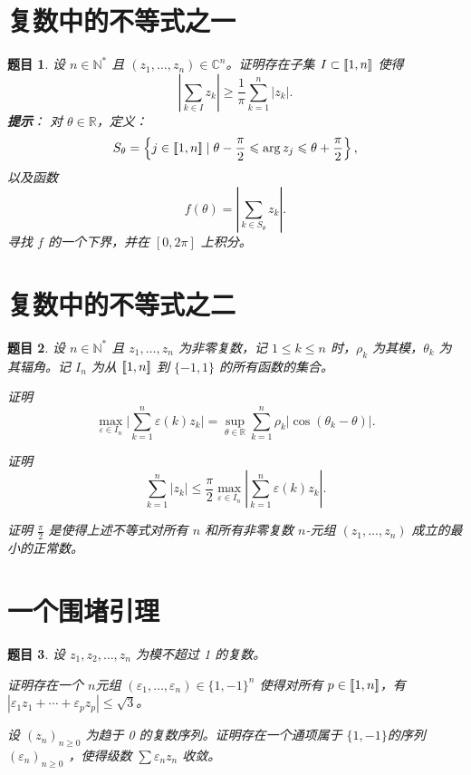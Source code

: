 \documentclass[12pt,UTF8,fontset=none]{ctexbook}
\theoremstyle{exercisestyle}
\newtheorem*{exercise}{题目}
\theoremstyle{solutionstyle}
\begin{document}
\section{复数中的不等式之一}
\begin{exercise}
设 \( n \in \mathbb{N}^* \) 且 \( (z_1, \ldots, z_n) \in \mathbb{C}^n \)。证明存在子集 \( I \subset [\![1,n]\!] \) 使得
\[
\left| \sum_{k \in I} z_k \right| \geqslant \frac{1}{\pi} \sum_{k=1}^n |z_k|.
\]
\textbf{提示}：
对 \(\theta \in \mathbb{R}\)，定义：
\[
S_{\theta} = \left\{ j \in[\![1,n]\!] \mid \theta - \frac{\pi}{2} \leqslant \arg z_j \leqslant \theta + \frac{\pi}{2} \right\},
\]
以及函数
\[
f(\theta) = \left| \sum_{k \in S_{\theta}} z_k \right|.
\]
寻找 \( f \) 的一个下界，并在 \([0, 2\pi]\) 上积分。
\end{exercise}

\section{复数中的不等式之二}
\begin{exercise}
设 \( n \in \mathbb{N}^* \) 且 \( z_1, \ldots, z_n \) 为非零复数，记 \( 1 \leq k \leq n \) 时，\( \rho_k \) 为其模，\( \theta_k \) 为其辐角。记 \( I_n \) 为从 \([\![1,n]\!]\) 到 \(\{-1, 1\}\) 的所有函数的集合。
\begin{subquestions}
\item 证明
\[
\max_{\varepsilon \in I_n} \Big| \sum_{k=1}^n \varepsilon(k) z_k \Big| = \sup_{\theta \in \mathbb{R}} \sum_{k=1}^n \rho_k |\cos(\theta_k - \theta)|.
\]

\item 证明
\[
\sum_{k=1}^{n} |z_k| \leqslant \frac{\pi}{2} \max_{\varepsilon \in I_n} \left| \sum_{k=1}^{n} \varepsilon(k) z_k \right|.
\]

\item 证明 \( \displaystyle\frac{\pi}{2} \) 是使得上述不等式对所有 \( n \) 和所有非零复数 \( n \)-元组 \( (z_1,\ldots,z_n) \) 成立的最小的正常数。
\end{subquestions}
\end{exercise}

\section{一个围堵引理}
\begin{exercise}
设 \( z_1, z_2, \ldots, z_n \) 为模不超过 1 的复数。
\begin{subquestions}
\item 证明存在一个 \( n \)元组 \( (\varepsilon_1, \ldots, \varepsilon_n) \in \{1, -1\}^n \) 使得对所有 \( p \in [\![1,n]\!] \)，有 \( |\varepsilon_1 z_1 + \cdots + \varepsilon_p z_p| \leqslant \sqrt{3} \)。
\item 设 \( (z_n)_{n \geq 0} \) 为趋于 0 的复数序列。证明存在一个通项属于 \( \{1, -1\} \)的序列 \( (\varepsilon_n)_{n \geqslant 0} \) ，使得级数 \( \sum \varepsilon_n z_n \) 收敛。
\end{subquestions}
\end{exercise}
\end{document}
